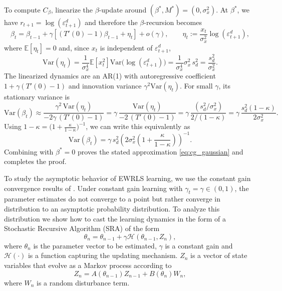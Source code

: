 \documentclass[11pt]{article}
\begin{document}
To compute $C_\beta$, linearize the $\beta$-update around $(\beta^*,M^*)=(0,\sigma_x^2)$.
At $\beta^*$, we have $r_{t+1}=\log(\varepsilon^d_{t+1})$ and therefore the $\beta$-recursion becomes
\[
\beta_t
=
\beta_{t-1}
+
\gamma\left[(T'(0)-1)\beta_{t-1} + \eta_t\right]
+o(\gamma),
\qquad
\eta_t:=\frac{x_t}{\sigma_x^2}\log(\varepsilon^d_{t+1}),
\]
where $\mathbb E[\eta_t]=0$ and, since $x_t$ is independent of $\varepsilon^d_{t+1}$,
\[
\mathrm{Var}(\eta_t)
=
\frac{1}{\sigma_x^4}\mathbb E[x_t^2]\mathrm{Var}\!\big(\log(\varepsilon^d_{t+1})\big)
=
\frac{1}{\sigma_x^4}\sigma_x^2\,s_d^2
=
\frac{s_d^2}{\sigma_x^2}.
\]
The linearized dynamics are an AR(1) with autoregressive coefficient $1+\gamma(T'(0)-1)$ and innovation variance $\gamma^2\mathrm{Var}(\eta_t)$.
For small $\gamma$, its stationary variance is
\begin{equation}
    \mathrm{Var}(\beta_t)
    \approx
    \frac{\gamma^2\,\mathrm{Var}(\eta_t)}{-2\gamma\,(T'(0)-1)}
    =
    \gamma\,\frac{\mathrm{Var}(\eta_t)}{-2\,(T'(0)-1)}
    =
    \gamma\,\frac{(s_d^2/\sigma_x^2)}{2/(1-\kappa)}
    =
    \gamma\,\frac{s_d^2(1-\kappa)}{2\sigma_x^2}.
\end{equation}
Using $1-\kappa=\big(1+\frac{\kappa}{1-\kappa}\big)^{-1}$, we can write this equivalently as
\[
\mathrm{Var}(\beta_t)
=
\gamma\, s_d^2\left(2\sigma_x^2\left(1+\frac{\kappa}{1-\kappa}\right)\right)^{-1}.
\]
Combining with $\beta^*=0$ proves the stated approximation \eqref{eq:cg_gaussian} and completes the proof.


To study the asymptotic behavior of EWRLS learning, we use the constant gain convergence results of \cite{GeorgeWEvans2001}.
Under constant gain learning with $\gamma_t = \gamma \in (0,1)$, the parameter estimates do not converge to a point but rather converge in distribution to an asymptotic probability distribution.
To analyze this distribution we show how to cast the learning dynamics in the form of a Stochastic Recursive Algorithm (SRA) of the form 
\begin{equation}\label{eq:general_sra_cg}
    \theta_n = \theta_{n-1} + \gamma \mathcal{H}(\theta_{n-1}, Z_n),
\end{equation}
where $\theta_n$ is the parameter vector to be estimated, $\gamma$ is a constant gain and $\mathcal{H}(\cdot)$ is a function capturing the updating mechanism.
$Z_n$ is a vector of state variables that evolve as a Markov process according to
\begin{equation}\label{eq:state_evolution_sra_cg}
    Z_n = A(\theta_{n-1}) Z_{n-1} + B(\theta_n) W_n,
\end{equation}
where $W_n$ is a random disturbance term. 
\end{document}
